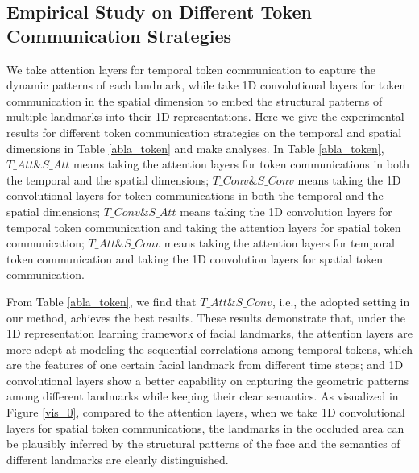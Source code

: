 \documentclass[review]{elsarticle}
\begin{document}
\subsection{Empirical Study on Different Token Communication Strategies}
\label{tcs}
We take attention layers for temporal token communication to capture the dynamic patterns of each landmark, while take 1D convolutional layers for token communication in the spatial dimension to embed the structural patterns of multiple landmarks into their 1D representations. Here we give the experimental results for different token communication strategies on the temporal and spatial dimensions in Table \ref{abla_token} and make analyses. In Table \ref{abla_token},  $T\_Att\&S\_Att$ means taking the attention layers for token communications in both the temporal and the spatial dimensions; $T\_Conv\&S\_Conv$ means taking the 1D convolutional layers for token communications in both the temporal and the spatial dimensions; $T\_Conv\&S\_Att$ means taking the 1D convolution layers for temporal token communication and taking the attention layers for spatial token communication; $T\_Att\&S\_Conv$ means taking the attention layers for temporal token communication and taking the 1D convolution layers for spatial token communication.

From Table \ref{abla_token}, we find that $T\_Att\&S\_Conv$, i.e., the adopted setting in our method, achieves the best results. These results demonstrate that, under the 1D representation learning framework of facial landmarks, the attention layers are more adept at modeling the sequential correlations among temporal tokens, which are the features of one certain facial landmark from different time steps; and 1D convolutional layers show a better capability on capturing the geometric patterns among different landmarks while keeping their clear semantics. As visualized in Figure \ref{vis_0}, compared to the attention layers, when we take 1D convolutional layers for spatial token communications,  the landmarks in the occluded area can be plausibly inferred by the structural patterns of the face and the semantics of different landmarks are clearly distinguished.
\end{document}
